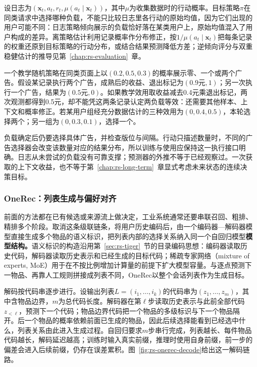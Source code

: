 设日志为$(\bm x_t,a_t,r_t,\mu(a_t\mid\bm x_t))$，其中$\mu$为收集数据时的行动概率。目标策略$\pi$在同类请求中选择哪种负载，不能只比较日志里各行动的原始均值，因为它们出现的用户可能不同：日志策略倾向展示的负载恰好落在某类用户上，原始均值混入了用户构成的差异。离策略估计利用记录概率作分布修正，按$1/\mu(a_t\mid\bm x_t)$把每条记录的权重还原到目标策略的行动分布，或结合结果预测降低方差；逆倾向评分与双重稳健估计的推导见第~\ref{chap:rs-evaluation}~章。

一个教学随机策略在同类页面上以$(0.2,0.5,0.3)$的概率展示零、一个或两个广告。假设某记录执行两个广告，成熟后的收益、退出标记为$(0.9\text{元},1)$；另一次执行一个广告，结果为$(0.5\text{元},0)$。如果教学效用取收益减去0.4元乘退出标记，两次观测都得到0.5元，却不能凭这两条记录认定两负载等效：还需要其他样本、上下文和概率修正。若某用户组经充分数据估计的三种效用为$(0,0.4,0.5)$，本轮选择两个；另一组为$(0,0.3,0.1)$，选择一个。

负载确定后仍要选择具体广告，并检查版位与间隔。行动只描述数量时，不同的广告选择器会改变该数量对应的结果分布，所以训练与使用应保持这一执行接口明确。日志从未尝试的负载没有可靠支撑；预测器的外推不等于已经观察过。一次获取的上下文收益，也不等于第~\ref{chap:rs-long-term}~章显式考虑未来状态的连续决策目标。

\subsubsection{OneRec：列表生成与偏好对齐}
\label{sec:rs-onerec}

前面的方法都在已有候选或来源流上做决定，工业系统通常还要串联召回、粗排、精排多个阶段。取消这条级联链条，将用户历史编码后，由一个编码器—解码器模型直接生成多个物品的语义标识，把列表内部的选择关系纳入同一个自回归模型\textbf{模型结构。}语义标识的构造沿用第~\ref{sec:rs-tiger}~节的目录编码思想：编码器读取历史代码，解码器读取历史表示和已经生成的目标代码；稀疏专家网络（mixture of experts, MoE）用于在不按比例增加计算量的前提下扩大模型容量。与逐点预测下一物品、再靠人工规则拼接成列表不同，OneRec以整个会话列表作为生成目标。

解码按代码串逐步进行。设输出列表$L=(i_1,\ldots,i_k)$的代码串为$(z_1,\ldots,z_m)$，其中含物品边界，$m$为总代码长度。解码器在第$\ell$步读取历史表示与此前全部代码$z_{<\ell}$，预测下一个代码；物品边界代码把一个物品的多级标识与下一个物品隔开。后一个物品的概率依赖前面已生成的物品，因此后续选择能看到已经选中什么，列表关系由此进入生成过程。自回归要求$m$步串行完成，列表越长、每件物品代码越长，解码延迟越高；训练时输入真实前缀，推理时使用自身前缀，前一步的偏差会进入后续前缀，仍存在误差累积。图~\ref{fig:rs-onerec-decode}给出这一解码链路。

